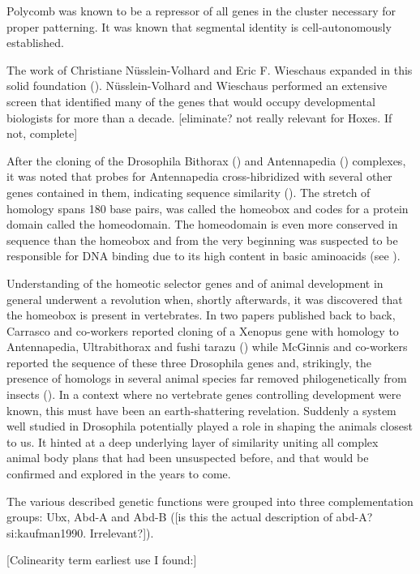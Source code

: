 Polycomb was known to be a repressor of all genes in the cluster necessary for proper patterning. It was known that segmental identity is cell-autonomously established. 

The work of Christiane Nüsslein-Volhard and Eric F. Wieschaus expanded in this solid foundation (\cite{Nuesslein-Volhard1980}). Nüsslein-Volhard and Wieschaus performed an extensive screen that identified many of the genes that would occupy developmental biologists for more than a decade. [eliminate? not really relevant for Hoxes. If not, complete]

After the cloning of the Drosophila Bithorax (\cite{Bender1983}) and Antennapedia (\cite{Garber1983,Scott1983}) complexes, it was noted that probes for Antennapedia cross-hibridized with several other genes contained in them, indicating sequence similarity (\cite{McGinnis1984}).  The stretch of homology spans 180 base pairs, was called the homeobox and codes for a protein domain called the homeodomain. The homeodomain is even more conserved in sequence than the homeobox and from the very beginning was suspected to be responsible for DNA binding due to its high content in basic aminoacids (see \cite{Gehring1985}).

Understanding of the homeotic selector genes and of animal development in general underwent a revolution when, shortly afterwards, it was discovered that the homeobox is present in vertebrates. In two papers published back to back, Carrasco and co-workers reported cloning of a Xenopus gene with homology to Antennapedia, Ultrabithorax and fushi tarazu (\cite{Carrasco1984}) while McGinnis and co-workers reported the sequence of these three Drosophila genes and, strikingly, the presence of homologs in several animal species far removed philogenetically from insects (\cite{McGinnis1984b}). In a context where no vertebrate genes controlling development were known, this must have been an earth-shattering revelation. Suddenly a system well studied in Drosophila potentially played a role in shaping the animals closest to us. It hinted at a deep underlying layer of similarity uniting all complex animal body plans that had been unsuspected before, and that would be confirmed and explored in the years to come.

The various described genetic functions were grouped into three complementation groups: Ubx, Abd-A and Abd-B (\cite{Sanchez-Herrero1985}[is this the actual description of abd-A?si:kaufman1990. Irrelevant?]).

[Colinearity term earliest use I found:\cite{Lewis1985}]

